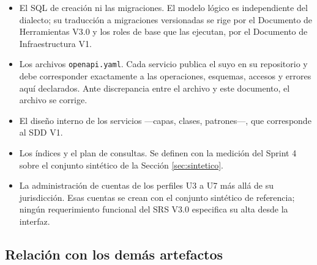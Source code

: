 \documentclass[11pt,a4paper]{article}
\begin{document}
\begin{itemize}
\item El SQL de creación ni las migraciones. El modelo lógico es independiente del dialecto; su traducción a migraciones versionadas se rige por el Documento de Herramientas V3.0 y los roles de base que las ejecutan, por el Documento de Infraestructura V1.
\item Los archivos \texttt{openapi.yaml}. Cada servicio publica el suyo en su repositorio y debe corresponder exactamente a las operaciones, esquemas, accesos y errores aquí declarados. Ante discrepancia entre el archivo y este documento, el archivo se corrige.
\item El diseño interno de los servicios ---capas, clases, patrones---, que corresponde al SDD V1.
\item Los índices y el plan de consultas. Se definen con la medición del Sprint 4 sobre el conjunto sintético de la Sección \ref{sec:sintetico}.
\item La administración de cuentas de los perfiles U3 a U7 más allá de su jurisdicción. Esas cuentas se crean con el conjunto sintético de referencia; ningún requerimiento funcional del SRS V3.0 especifica su alta desde la interfaz.
\end{itemize}

\subsection{Relación con los demás artefactos}
\end{document}
